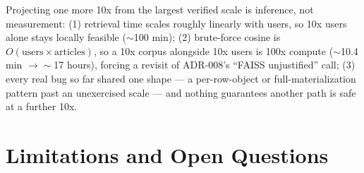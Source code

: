 \documentclass[10.5pt]{article}
\begin{document}
Projecting one more 10x from the largest verified scale is inference, not
measurement: (1) retrieval time scales roughly linearly with users, so
10x users alone stays locally feasible ($\sim$100 min); (2) brute-force
cosine is $O(\text{users}\times\text{articles})$, so a 10x corpus
alongside 10x users is 100x compute ($\sim$10.4 min $\to \sim$17 hours),
forcing a revisit of ADR-008's ``FAISS unjustified'' call; (3) every real
bug so far shared one shape --- a per-row-object or full-materialization
pattern past an unexercised scale --- and nothing guarantees another path
is safe at a further 10x.

\section{Limitations and Open Questions}
\enlargethispage{3\baselineskip}
\end{document}
